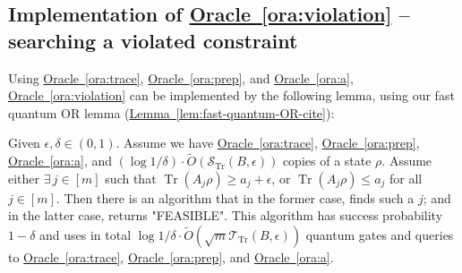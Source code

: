 \documentclass[a4paper,UKenglish,cleveref, autoref]{lipics-v2019}
\theoremstyle{remark}
\numberwithin{equation}{section}
\numberwithin{oracle}{section}
\numberwithin{remark}{section}
\newcommand{\ora}[1]{\hyperref[ora:#1]{Oracle~\ref*{ora:#1}}}
\newcommand{\lem}[1]{\hyperref[lem:#1]{Lemma~\ref*{lem:#1}}}
\newcommand{\range}[1]{[#1]}
\DeclareMathOperator{\tr}{Tr}
\begin{document}
\subsection{Implementation of \ora{violation} -- searching a violated constraint}
Using \ora{trace}, \ora{prep}, and \ora{a}, \ora{violation} can be implemented by the following lemma, using our fast quantum OR lemma (\lem{fast-quantum-OR-cite}):
\begin{lemma}\label{lem:oracle-implementation}
Given $\epsilon,\delta\in (0,1)$. Assume we have \ora{trace}, \ora{prep}, \ora{a}, and $(\log 1/\delta)\cdot\tilde{O}(\mathcal{S}_{\tr}(B,\epsilon))$ copies of a state $\rho$. Assume either $\exists\,j\in\range{m}$ such that $\tr(A_{j} \rho)\geq a_{j}+\epsilon$, or $\tr(A_{j} \rho)\leq a_{j}$ for all $j\in\range{m}$. Then there is an algorithm that in the former case, finds such a $j$; and in the latter case, returns "FEASIBLE". This algorithm has success probability $1-\delta$ and uses in total $\log 1/\delta\cdot\tilde{O}(\sqrt{m}\mathcal{T}_{\tr}(B,\epsilon))$ quantum gates and queries to \ora{trace}, \ora{prep}, and \ora{a}.
\end{lemma}
\end{document}
